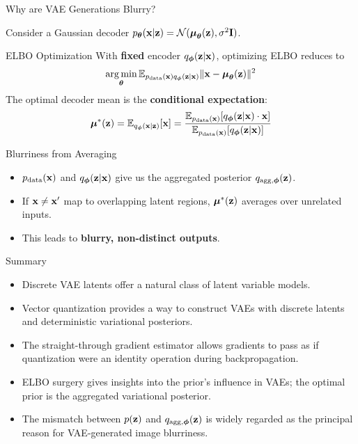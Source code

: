 \documentclass{beamer}
\begin{document}
\begin{frame}{Why are VAE Generations Blurry?}
	
	Consider a Gaussian decoder $p_{\boldsymbol{\theta}}(\mathbf{x} | \mathbf{z}) = \mathcal{N}(\boldsymbol{\mu}_{\boldsymbol{\theta}}(\mathbf{z}), \sigma^2 \mathbf{I})$.
	\eqpause
	\begin{block}{ELBO Optimization}
		With \textbf{fixed} encoder $q_{\boldsymbol{\phi}}(\mathbf{z} | \mathbf{x})$, optimizing ELBO reduces to
		\vspace{-0.3cm}
		\[
			\operatorname*{arg\,min}_{\boldsymbol{\theta}} \mathbb{E}_{p_{\text{data}}(\mathbf{x}) q_{\boldsymbol{\phi}}(\mathbf{z} | \mathbf{x})} \| \mathbf{x} - \boldsymbol{\mu}_{\boldsymbol{\theta}}(\mathbf{z}) \|^2
		\]
		The optimal decoder mean is the \textbf{conditional expectation}:
		\vspace{-0.3cm}
		\[
			\boldsymbol{\mu}^*(\mathbf{z}) = \mathbb{E}_{q_{\boldsymbol{\phi}}(\mathbf{x} | \mathbf{z})}[\mathbf{x}] = \frac{\mathbb{E}_{p_{\text{data}}(\mathbf{x})}[q_{\boldsymbol{\phi}}(\mathbf{z} | \mathbf{x}) \cdot \mathbf{x}]}{\mathbb{E}_{p_{\text{data}}(\mathbf{x})}[q_{\boldsymbol{\phi}}(\mathbf{z} | \mathbf{x})]}
		\]
		\vspace{-0.7cm}
	\end{block}
	\eqpause
	\begin{block}{Blurriness from Averaging}
		\begin{itemize}
			\item $p_{\text{data}}(\mathbf{x})$ and $q_{\boldsymbol{\phi}}(\mathbf{z} | \mathbf{x})$ give us the aggregated posterior $q_{\text{agg}, \boldsymbol{\phi}}(\mathbf{z})$.
			\item If $\mathbf{x} \neq \mathbf{x}'$ map to overlapping latent regions, $\boldsymbol{\mu}^*(\mathbf{z})$ averages over unrelated inputs.
			\item This leads to \textbf{blurry, non-distinct outputs}.
		\end{itemize}
	\end{block}
\end{frame}
\begin{frame}{Summary}
	\begin{itemize}
		\item Discrete VAE latents offer a natural class of latent variable models.	
		\vfill
		\item Vector quantization provides a way to construct VAEs with discrete latents and deterministic variational posteriors.
		\vfill
		\item The straight-through gradient estimator allows gradients to pass as if quantization were an identity operation during backpropagation.			
		\vfill
		\item ELBO surgery gives insights into the prior's influence in VAEs; the optimal prior is the aggregated variational posterior. 
		\vfill
		\item The mismatch between $p(\mathbf{z})$ and $q_{\text{agg}, \boldsymbol{\phi}}(\mathbf{z})$ is widely regarded as the principal reason for VAE-generated image blurriness.
	\end{itemize}
\end{frame}
\end{document}
